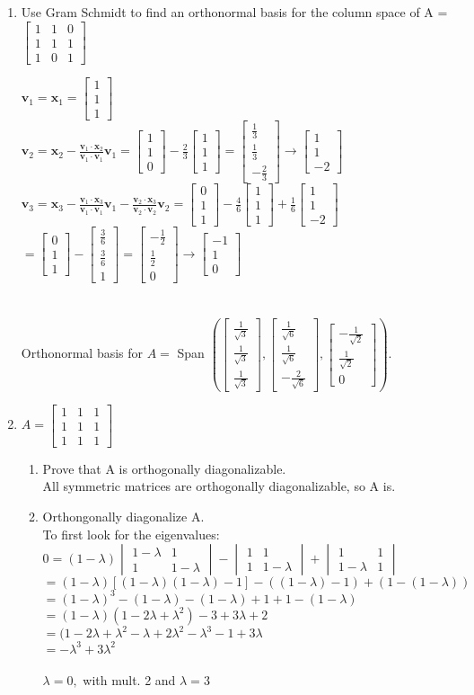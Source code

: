 \documentclass{article}
\newcommand\tab[1][1cm]{\hspace*{#1}}
\newcommand{\newVect}[3]{\begin{bmatrix}#1 \\ #2 \\ #3\end{bmatrix}}
\newcommand{\newttt}[9]{\begin{bmatrix}#1 & #2 & #3\\ #4 & #5 & #6 \\ #7 & #8 & #9\end{bmatrix}}
\newcommand{\newdet}[4]{\begin{vmatrix}#1 & #2\\ #3 & #4 \end{vmatrix}}
\begin{document}
\begin{enumerate}
\item
Use Gram Schmidt to find an orthonormal basis for the column space of A = 
$\begin{bmatrix}1 & 1 & 0\\ 1 & 1 & 1 \\ 1 & 0 & 1\end{bmatrix}$
\\
\par
$\textbf{v}_1 = \textbf{x}_1 = \newVect{1}{1}{1}$\\
$\textbf{v}_2 = \textbf{x}_2 - \frac{\textbf{v}_1 \cdot \textbf{x}_2}{\textbf{v}_1 \cdot \textbf{v}_1}\textbf{v}_1 = \newVect{1}{1}{0} - \frac{2}{3}\newVect{1}{1}{1} =  \newVect{\frac{1}{3}}{\frac{1}{3}}{-\frac{2}{3}} \rightarrow \newVect{1}{1}{-2}$\\
$\textbf{v}_3 = \textbf{x}_3 - \frac{\textbf{v}_1 \cdot \textbf{x}_3}{\textbf{v}_1 \cdot \textbf{v}_1}\textbf{v}_1 - \frac{\textbf{v}_2 \cdot \textbf{x}_3}{\textbf{v}_2 \cdot \textbf{v}_2}\textbf{v}_2 = \newVect{0}{1}{1} - \frac{4}{6}\newVect{1}{1}{1} + \frac{1}{6}\newVect{1}{1}{-2}$\\
\tab$=\newVect{0}{1}{1} - \newVect{\frac{3}{6}}{\frac{3}{6}}{1} = \newVect{-\frac{1}{2}}{\frac{1}{2}}{0} \rightarrow \newVect{-1}{1}{0}$\\\\\\
Orthonormal basis for $A = $ Span
$\left( \newVect{\frac{1}{\sqrt{3}}}{\frac{1}{\sqrt{3}}}{\frac{1}{\sqrt{3}}}, \newVect{\frac{1}{\sqrt{6}}}{\frac{1}{\sqrt{6}}}{-\frac{2}{\sqrt{6}}}, \newVect{-\frac{1}{\sqrt{2}}}{\frac{1}{\sqrt{2}}}{0}\right)$.
\par
\newpage

\item
$A = \newttt{1}{1}{1}{1}{1}{1}{1}{1}{1}$
\par
\begin{enumerate}
    \item Prove that A is orthogonally diagonalizable.\\
        All symmetric matrices are orthogonally diagonalizable, so A is.\\
    \item Orthongonally diagonalize A.\\
    To first look for the eigenvalues:\\
$0 = (1-\lambda)\newdet{1-\lambda}{1}{1}{1-\lambda} - \newdet{1}{1}{1}{1-\lambda} + \newdet{1}{1}{1-\lambda}{1}$\\
$= (1-\lambda)[(1-\lambda)(1-\lambda)-1] - ((1-\lambda)-1) +(1-(1-\lambda))$\\
$= (1-\lambda)^3 - (1-\lambda) - (1-\lambda) + 1 + 1 - (1 - \lambda)$\\ 
$= (1-\lambda)(1-2\lambda+\lambda^2) - 3 + 3\lambda +2$\\
$= (1 - 2\lambda + \lambda^2 - \lambda + 2\lambda^2 - \lambda^3 - 1 + 3\lambda$\\
$= -\lambda^3 + 3\lambda^2$\\\\
\tab $\lambda = 0,$ with mult. 2 and  $\lambda = 3$\\


\end{enumerate}
\end{enumerate}
\end{document}
